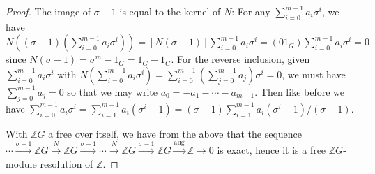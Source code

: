 \documentclass[11pt]{article}
\DeclareMathOperator{\aug}{aug}
\begin{document}
\begin{enumerate}
\begin{enumerate}
\begin{proof}
            The image of $\sigma-1$ is equal to the kernel of $N$: For any $\sum_{i=0}^{m-1}a_i\sigma^i$, we have $N((\sigma-1)(\sum_{i=0}^{m-1}a_i\sigma^i)) = [N(\sigma-1)]\sum_{i=0}^{m-1}a_i\sigma^i = (01_G)\sum_{i=0}^{m-1}a_i\sigma^i = 0$ since $N(\sigma-1) = \sigma^m-1_G = 1_G - 1_G$. For the reverse inclusion, given $\sum_{i=0}^{m-1}a_i\sigma^i$ with $N(\sum_{i=0}^{m-1}a_i\sigma^i) = \sum_{i=0}^{m-1}(\sum_{j=0}^{m-1}a_j)\sigma^i = 0$, we must have $\sum_{j=0}^{m-1}a_j = 0$ so that we may write $a_0 = -a_1-\cdots-a_{m-1}$. Then like before we have $\sum_{i=0}^{m-1}a_i\sigma^i = \sum_{i=1}^{m-1}a_i(\sigma^i-1) = (\sigma-1)\sum_{i=1}^{m-1}a_i(\sigma^i-1)/(\sigma-1)$.

            With $\mathbb{Z}G$ a free over itself, we have from the above that the sequence $\cdots\xrightarrow{\sigma-1}\mathbb{Z}G\xrightarrow{N}\mathbb{Z}G\xrightarrow{\sigma-1}\cdots\xrightarrow{N}\mathbb{Z}G\xrightarrow{\sigma-1}\mathbb{Z}G\xrightarrow{\aug}\mathbb{Z}\to 0$ is exact, hence it is a free $\mathbb{Z}G$-module resolution of $\mathbb{Z}$.
        \end{proof}
    \end{enumerate}
\end{enumerate}
\end{document}
